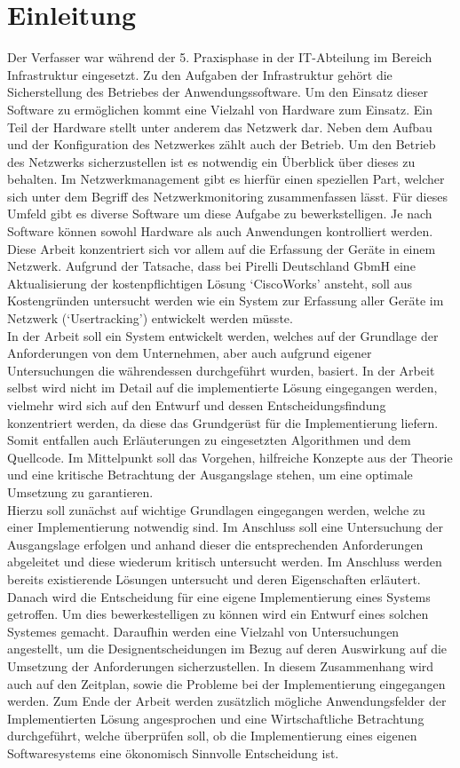 \chapter{Einleitung}
\label{cha:Einleitung}

Der Verfasser war während der 5. Praxisphase in der IT-Abteilung im Bereich Infrastruktur eingesetzt.
Zu den Aufgaben der Infrastruktur gehört die Sicherstellung des Betriebes der Anwendungssoftware. Um den Einsatz dieser Software zu ermöglichen kommt eine Vielzahl von Hardware zum Einsatz. Ein Teil der Hardware stellt unter anderem das Netzwerk dar. Neben dem Aufbau und der Konfiguration des Netzwerkes zählt auch der Betrieb. Um den Betrieb des Netzwerks sicherzustellen ist es notwendig ein Überblick über dieses zu behalten.
Im Netzwerkmanagement gibt es hierfür einen speziellen Part, welcher sich unter dem Begriff des Netzwerkmonitoring zusammenfassen lässt. Für dieses Umfeld gibt es diverse Software um diese Aufgabe zu bewerkstelligen. Je nach Software können sowohl Hardware als auch Anwendungen kontrolliert werden. Diese Arbeit konzentriert sich vor allem auf die Erfassung der Geräte in einem Netzwerk. Aufgrund der Tatsache, dass bei Pirelli Deutschland GbmH eine Aktualisierung der kostenpflichtigen Lösung ‘CiscoWorks’ ansteht, soll aus Kostengründen untersucht werden wie ein System zur Erfassung aller Geräte im Netzwerk (‘Usertracking’) entwickelt werden müsste.\\
In der Arbeit soll ein System entwickelt werden, welches auf der Grundlage der Anforderungen von dem Unternehmen, aber auch aufgrund eigener Untersuchungen die währendessen durchgeführt wurden, basiert. In der Arbeit selbst wird nicht im Detail auf die implementierte Lösung eingegangen werden, vielmehr wird sich auf den Entwurf und dessen Entscheidungsfindung konzentriert werden, da diese das Grundgerüst für die Implementierung liefern. Somit entfallen auch Erläuterungen zu eingesetzten Algorithmen und dem Quellcode.
Im Mittelpunkt soll das Vorgehen, hilfreiche Konzepte aus der Theorie und eine kritische Betrachtung der Ausgangslage stehen, um eine optimale Umsetzung zu garantieren.\\
Hierzu soll zunächst auf wichtige Grundlagen eingegangen werden, welche zu einer Implementierung notwendig sind. Im Anschluss soll eine Untersuchung der Ausgangslage erfolgen und anhand dieser die entsprechenden Anforderungen abgeleitet und diese wiederum kritisch untersucht werden. Im Anschluss werden bereits existierende Lösungen untersucht und deren Eigenschaften erläutert. Danach wird die Entscheidung für eine eigene Implementierung eines Systems getroffen. Um dies bewerkestelligen zu können wird ein Entwurf eines solchen Systemes gemacht. Daraufhin werden eine Vielzahl von Untersuchungen angestellt, um die Designentscheidungen im Bezug auf deren Auswirkung auf die Umsetzung der Anforderungen sicherzustellen. In diesem Zusammenhang wird auch auf den Zeitplan, sowie die Probleme bei der Implementierung eingegangen werden.
Zum Ende der Arbeit werden zusätzlich mögliche Anwendungsfelder der Implementierten Lösung angesprochen und eine Wirtschaftliche Betrachtung durchgeführt, welche überprüfen soll, ob die Implementierung eines eigenen Softwaresystems eine ökonomisch Sinnvolle Entscheidung ist.\\
